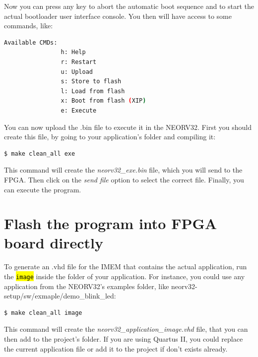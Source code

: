        Now you can press any key to abort the automatic boot sequence and to start the actual bootloader user interface console. You then will have access to some commands, like:
        
            \begin{lstlisting}[style=mystyle_bash, language=bash]
                Available CMDs:
                h: Help
                r: Restart
                u: Upload
                s: Store to flash
                l: Load from flash
                x: Boot from flash (XIP)
                e: Execute
            \end{lstlisting}
        
        You can now upload the .bin file to execute it in the NEORV32. First you should create this file, by going to your application's folder and compiling it: 
        
            \begin{lstlisting}[style=mystyle_bash, language=bash]
                $ make clean_all exe
            \end{lstlisting}
    
        This command will create the \textit{neorv32\_exe.bin} file, which you will send to the FPGA. Then click on the \textit{send file} option to select the correct file. Finally, you can execute the program.
        
    \section{Flash the program into FPGA board directly} \label{sec:section_comp.2}
        
        To generate an .vhd file for the IMEM that contains the actual application, run the \texttt{\hl{image}} inside the folder of your application. For instance, you could use any application from the NEORV32's examples folder, like neorv32-setup/sw/exmaple/demo\_blink\_led:
        
            \begin{lstlisting}[style=mystyle_bash, language=bash]
                $ make clean_all image
            \end{lstlisting}
        
        This command will create the \textit{neorv32\_application\_image.vhd} file, that you can then add to the project's folder. If you are using Quartus II, you could replace the current application file or add it to the project if don't exists already.